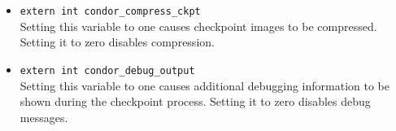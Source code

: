 \begin{itemize}
\item \verb$extern int condor_compress_ckpt$\\
Setting this variable to one causes checkpoint images to be compressed.
Setting it to zero disables compression.

\item \verb$extern int condor_debug_output$\\
Setting this variable to one causes additional debugging information
to be shown during the checkpoint process.  Setting it to zero
disables debug messages.

\end{itemize}
